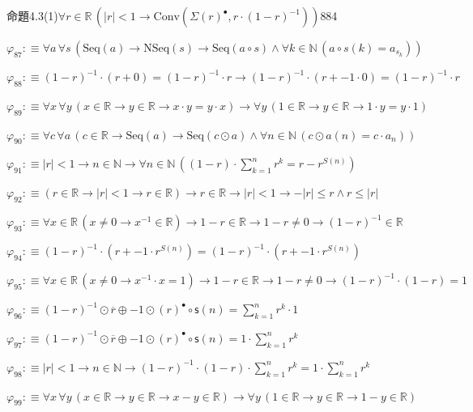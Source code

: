 \begin{fullproof}{命題4.3(1)}{$\forall r \in \mathbb{R}\,(\lvert r \rvert < 1 \to \mathrm{Conv}(\Sigma {(r)^{\bullet}},r \cdot (1 - r)^{-1}))$}{884}
\begin{abbrevlist}
\item $\varphi_{87} :\equiv \forall a\,\forall s\,(\mathrm{Seq}(a) \to \mathrm{NSeq}(s) \to \mathrm{Seq}(a \circ s) \land \forall k \in \mathbb{N}\,(a \circ s(k) = a_{s_{k}}))$
\item $\varphi_{88} :\equiv (1 - r)^{-1} \cdot (r + 0) = (1 - r)^{-1} \cdot r \to (1 - r)^{-1} \cdot (r + -1 \cdot 0) = (1 - r)^{-1} \cdot r$
\item $\varphi_{89} :\equiv \forall x\,\forall y\,(x \in \mathbb{R} \to y \in \mathbb{R} \to x \cdot y = y \cdot x) \to \forall y\,(1 \in \mathbb{R} \to y \in \mathbb{R} \to 1 \cdot y = y \cdot 1)$
\item $\varphi_{90} :\equiv \forall c\,\forall a\,(c \in \mathbb{R} \to \mathrm{Seq}(a) \to \mathrm{Seq}(c \odot a) \land \forall n \in \mathbb{N}\,(c \odot a(n) = c \cdot a_{n}))$
\item $\varphi_{91} :\equiv \lvert r \rvert < 1 \to n \in \mathbb{N} \to \forall n \in \mathbb{N}\,((1 - r) \cdot {\textstyle\sum_{k=1}^{n} {{r}^{k}}} = r - {{r}^{S(n)}})$
\item $\varphi_{92} :\equiv (r \in \mathbb{R} \to \lvert r \rvert < 1 \to r \in \mathbb{R}) \to r \in \mathbb{R} \to \lvert r \rvert < 1 \to -\lvert r \rvert \leq r \land r \leq \lvert r \rvert$
\item $\varphi_{93} :\equiv \forall x \in \mathbb{R}\,(x \neq 0 \to x^{-1} \in \mathbb{R}) \to 1 - r \in \mathbb{R} \to 1 - r \neq 0 \to (1 - r)^{-1} \in \mathbb{R}$
\item $\varphi_{94} :\equiv (1 - r)^{-1} \cdot (r + -1 \cdot {{r}^{S(n)}}) = (1 - r)^{-1} \cdot (r + -1 \cdot {{r}^{S(n)}})$
\item $\varphi_{95} :\equiv \forall x \in \mathbb{R}\,(x \neq 0 \to x^{-1} \cdot x = 1) \to 1 - r \in \mathbb{R} \to 1 - r \neq 0 \to (1 - r)^{-1} \cdot (1 - r) = 1$
\item $\varphi_{96} :\equiv (1 - r)^{-1} \odot \overline{r} \oplus -1 \odot {(r)^{\bullet}} \circ \mathsf{s}(n) = {\textstyle\sum_{k=1}^{n} {{r}^{k}}} \cdot 1$
\item $\varphi_{97} :\equiv (1 - r)^{-1} \odot \overline{r} \oplus -1 \odot {(r)^{\bullet}} \circ \mathsf{s}(n) = 1 \cdot {\textstyle\sum_{k=1}^{n} {{r}^{k}}}$
\item $\varphi_{98} :\equiv \lvert r \rvert < 1 \to n \in \mathbb{N} \to (1 - r)^{-1} \cdot (1 - r) \cdot {\textstyle\sum_{k=1}^{n} {{r}^{k}}} = 1 \cdot {\textstyle\sum_{k=1}^{n} {{r}^{k}}}$
\item $\varphi_{99} :\equiv \forall x\,\forall y\,(x \in \mathbb{R} \to y \in \mathbb{R} \to x - y \in \mathbb{R}) \to \forall y\,(1 \in \mathbb{R} \to y \in \mathbb{R} \to 1 - y \in \mathbb{R})$

\end{abbrevlist}
\end{fullproof}
